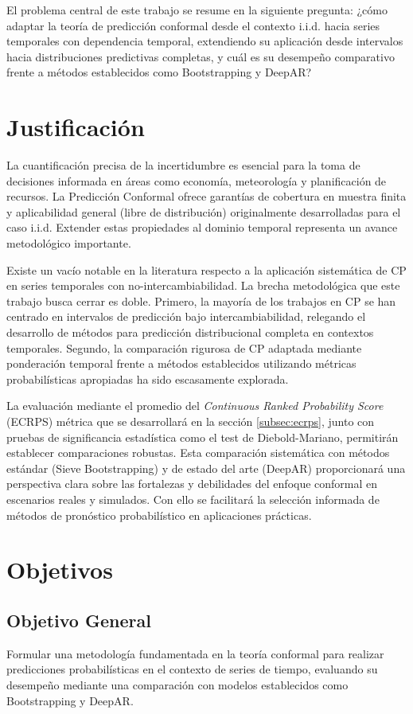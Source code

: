 El problema central de este trabajo se resume en la siguiente pregunta: ¿cómo adaptar la teoría de predicción conformal desde el contexto i.i.d. hacia series temporales con dependencia temporal, extendiendo su aplicación desde intervalos hacia distribuciones predictivas completas, y cuál es su desempeño comparativo frente a métodos establecidos como Bootstrapping y DeepAR?

\section{Justificación}

La cuantificación precisa de la incertidumbre es esencial para la toma de decisiones informada en áreas como economía, meteorología y planificación de recursos. La Predicción Conformal ofrece garantías de cobertura en muestra finita y aplicabilidad general (libre de distribución) originalmente desarrolladas para el caso i.i.d. Extender estas propiedades al dominio temporal representa un avance metodológico importante.

Existe un vacío notable en la literatura respecto a la aplicación sistemática de CP en series temporales con no-intercambiabilidad. La brecha metodológica que este trabajo busca cerrar es doble. Primero, la mayoría de los trabajos en CP se han centrado en intervalos de predicción bajo intercambiabilidad, relegando el desarrollo de métodos para predicción distribucional completa en contextos temporales. Segundo, la comparación rigurosa de CP adaptada mediante ponderación temporal frente a métodos establecidos utilizando métricas probabilísticas apropiadas ha sido escasamente explorada.

La evaluación mediante el promedio del \textit{Continuous Ranked Probability Score} (ECRPS) métrica que se desarrollará en la sección \ref{subsec:ecrps}, junto con pruebas de significancia estadística como el test de Diebold-Mariano, permitirán establecer comparaciones robustas. Esta comparación sistemática con métodos estándar (Sieve Bootstrapping) y de estado del arte (DeepAR) proporcionará una perspectiva clara sobre las fortalezas y debilidades del enfoque conformal en escenarios reales y simulados. Con ello se facilitará la selección informada de métodos de pronóstico probabilístico en aplicaciones prácticas.
\section{Objetivos}

\subsection{Objetivo General}
Formular una metodología fundamentada en la teoría conformal para realizar predicciones probabilísticas en el contexto de series de tiempo, evaluando su desempeño mediante una comparación con modelos establecidos como Bootstrapping y DeepAR.

